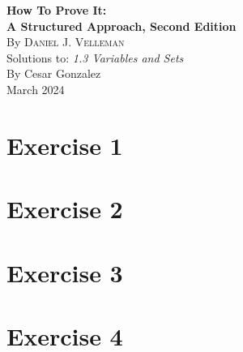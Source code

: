 \documentclass[letterpaper,12pt]{article}
\begin{document}
\pagestyle{fancy}
\setlength{\headheight}{15pt}
\begin{flushleft}

\begin{center}

    {\Large\textbf{How To Prove It:}\\[0.2em] %
    \Large\textbf{A Structured Approach, Second Edition}}\\[1.5em]

    {\normalsize By \textsc{Daniel J. Velleman}}\\[1.5em]

    Solutions to: \textit{1.3 Variables and Sets}\\[1.5em]

    By Cesar Gonzalez\\[0.5em]
    March 2024
\end{center}

\tableofcontents
\newpage

\section*{Exercise 1}


\section*{Exercise 2}


\section*{Exercise 3}


\section*{Exercise 4}



\end{flushleft}
\end{document}
